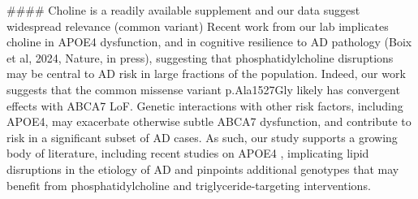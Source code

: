 #### Choline is a readily available supplement and our data suggest widespread relevance (common variant)
Recent work from our lab implicates choline in APOE4 dysfunction\cite{Sienski2021-zt}, and in cognitive resilience to AD pathology (Boix et al, 2024, Nature, in press), suggesting that phosphatidylcholine disruptions may be central to AD risk in large fractions of the population. Indeed, our work suggests that the common missense variant p.Ala1527Gly likely has convergent effects with ABCA7 LoF. Genetic interactions with other risk factors, including APOE4, may exacerbate otherwise subtle ABCA7 dysfunction, and contribute to risk in a significant subset of AD cases\cite{Wang2021-oa,Hemani2013-zr,Haig2011-vs,Zuk2012-uz}. As such, our study supports a growing body of literature, including recent studies on APOE4 \cite{Haney2024-fx,Victor2022-tl}, implicating lipid disruptions in the etiology of AD and pinpoints additional genotypes that may benefit from phosphatidylcholine and triglyceride-targeting interventions. 

